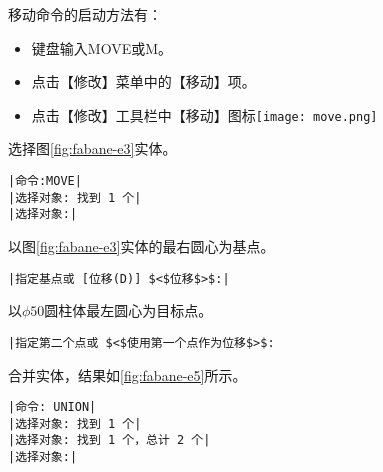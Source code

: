 \begin{procedure}
移动命令的启动方法有：
\begin{itemize}
\item 键盘输入MOVE或M。
\item 点击【修改】菜单中的【移动】项。
\item 点击【修改】工具栏中【移动】图标\texttt{[image: move.png]}
\end{itemize}
选择图\ref{fig:fabane-e3}实体。
\begin{lstlisting}
|命令:MOVE|
|选择对象: 找到 1 个|
|选择对象:|
\end{lstlisting}
以图\ref{fig:fabane-e3}实体的最右圆心为基点。
\begin{lstlisting}
|指定基点或 [位移(D)] $<$位移$>$:|
\end{lstlisting}
以$\phi 50$圆柱体最左圆心为目标点。
\begin{lstlisting}
|指定第二个点或 $<$使用第一个点作为位移$>$:
\end{lstlisting}
\item 合并实体，结果如\ref{fig:fabane-e5}所示。
\begin{lstlisting}
|命令: UNION|
|选择对象: 找到 1 个|
|选择对象: 找到 1 个，总计 2 个|
|选择对象:|
\end{lstlisting}
\end{procedure}

